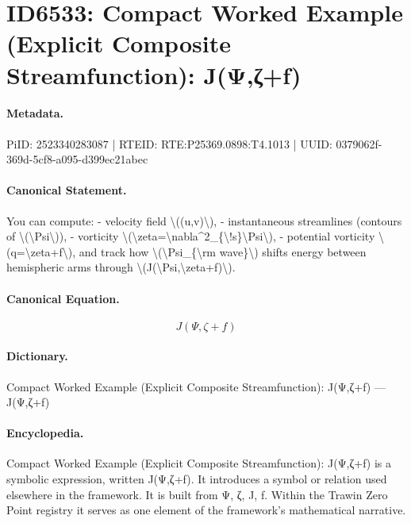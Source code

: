 \section*{ID6533: Compact Worked Example (Explicit Composite Streamfunction): J(Ψ,ζ+f)}
\paragraph{Metadata.}
PiID: 2523340283087 | RTEID: RTE:P25369.0898:T4.1013 | UUID: 0379062f-369d-5cf8-a095-d399ec21abec

\paragraph{Canonical Statement.}
You can compute: - velocity field \textbackslash{}((u,v)\textbackslash{}), - instantaneous streamlines (contours of \textbackslash{}(\textbackslash{}Psi\textbackslash{})), - vorticity \textbackslash{}(\textbackslash{}zeta=\textbackslash{}nabla\textasciicircum{}2\_\{\textbackslash{}!s\}\textbackslash{}Psi\textbackslash{}), - potential vorticity \textbackslash{}(q=\textbackslash{}zeta+f\textbackslash{}), and track how \textbackslash{}(\textbackslash{}Psi\_\{\textbackslash{}rm wave\}\textbackslash{}) shifts energy between hemispheric arms through \textbackslash{}(J(\textbackslash{}Psi,\textbackslash{}zeta+f)\textbackslash{}).

\paragraph{Canonical Equation.}
\[
J(\Psi,\zeta+f)
\]

\paragraph{Dictionary.}
Compact Worked Example (Explicit Composite Streamfunction): J(Ψ,ζ+f) — J(Ψ,ζ+f)

\paragraph{Encyclopedia.}
Compact Worked Example (Explicit Composite Streamfunction): J(Ψ,ζ+f) is a symbolic expression, written J(Ψ,ζ+f). It introduces a symbol or relation used elsewhere in the framework. It is built from Ψ, ζ, J, f. Within the Trawin Zero Point registry it serves as one element of the framework's mathematical narrative.
